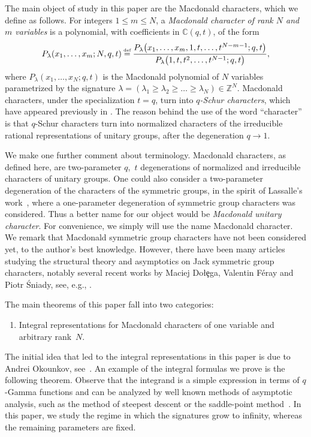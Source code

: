 \documentclass[pdftex]{sigma}
\numberwithin{equation}{section}
\newcommand\myeq{\mathrel{\stackrel{\makebox[0pt]{\mbox{\normalfont\tiny def}}}{=}}}
\newcommand{\C}{\mathbb{C}}
\newcommand{\Z}{\mathbb{Z}}
\begin{document}
The main object of study in this paper are the Macdonald characters, which we def\/ine as follows. For integers $1\leq m\leq N$, a \textit{Macdonald character of rank $N$ and $m$ variables} is a polynomial, with coef\/f\/icients in $\C(q, t)$, of the form
\begin{gather*}
P_{\lambda}(x_1, \dots, x_m; N, q, t) \myeq \frac{P_{\lambda}\big(x_1, \dots, x_m, 1, t, \dots, t^{N-m-1}; q, t\big)}{P_{\lambda}\big(1, t, t^2, \dots, t^{N-1}; q, t\big)},
\end{gather*}
where $P_{\lambda}(x_1, \dots, x_N; q, t)$ is the Macdonald polynomial of $N$ variables parametrized by the signature $\lambda = (\lambda_1 \geq \lambda_2 \geq \dots \geq \lambda_N)\in\Z^N$. Macdonald characters, under the specialization $t = q$, turn into \textit{$q$-Schur characters}, which have appeared previously in \cite{G, GP}. The reason behind the use of the word ``character'' is that $q$-Schur characters turn into normalized characters of the irreducible rational representations of unitary groups, after the degeneration $q \rightarrow 1$.

We make one further comment about terminology. Macdonald characters, as def\/ined here, are two-parameter $q$,~$t$ degenerations of normalized and irreducible characters of unitary groups. One could also consider a two-parameter degeneration of the characters of the symmetric groups, in the spirit of Lassalle's work~\cite{L}, where a one-parameter degeneration of symmetric group characters was considered. Thus a better name for our object would be \textit{Macdonald unitary character}. For convenience, we simply will use the name Macdonald character. We remark that Macdonald symmetric group characters have not been considered yet, to the author's best knowledge. However, there have been many articles studying the structural theory and asymptotics on Jack symmetric group characters, notably several recent works by Maciej Do{\l}\c{e}ga, Valentin F\'{e}ray and Piotr \'{S}niady, see, e.g., \cite{DF13, DF16, DFS, Sn}.

The main theorems of this paper fall into two categories:
\begin{enumerate}\itemsep=0pt
\item[(A)] Integral representations for Macdonald characters of one variable and arbitrary rank~$N$.
\end{enumerate}

The initial idea that led to the integral representations in this paper is due to Andrei Okounkov, see~\cite[remark following Theorem~3.6]{GP}. An example of the integral formulas we prove is the following theorem. Observe that the integrand is a simple expression in terms of $q$-Gamma functions and can be analyzed by well known methods of asymptotic analysis, such as the method of steepest descent or the saddle-point method~\cite{C}.
In this paper, we study the regime in which the signatures grow to inf\/inity, whereas the remaining parameters are f\/ixed.
\end{document}

